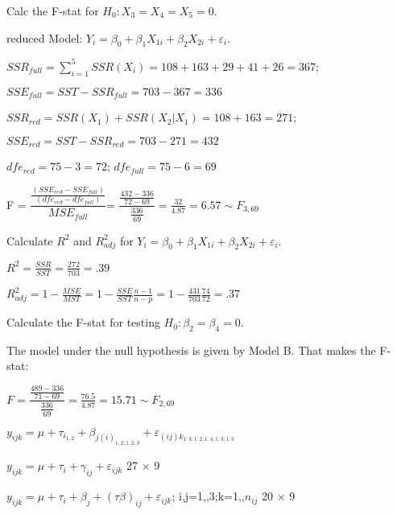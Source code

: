 \documentclass[
  10pt,
  twocolumn]{article}
\begin{document}
Calc the F-stat for \(H_0: X_3 = X_4 = X_5 = 0\).

reduced Model:
\(Y_i = \beta_0 + \beta_1X_{1i}+ \beta_2X_{2i} + \varepsilon_i\).

\(SSR_{full} = \sum_{i=1}^{5}SSR(X_i) = 108 + 163 + 29 + 41 + 26 = 367\);

\(SSE_{full} = SST - SSR_{full} = 703 - 367 = 336\)

\(SSR_{red} = SSR(X_1) + SSR(X_2|X_1) = 108+163 = 271\);

\(SSE_{red} = SST - SSR_{red} = 703 - 271 = 432\)

\(dfe_{red} = 75 - 3 = 72\); \(dfe_{full} = 75 - 6 = 69\)

F =
\(\dfrac{ \frac{(SSE_{red} - SSE_{full})}{(dfe_{red} - dfe_{full})}}{MSE_{full}}\)=
\(\dfrac{\frac{432-336}{72-69} }{\frac{336}{69}} = \frac{32}{4.87} = 6.57 \sim F_{3, 69}\)

Calculate \(R^2\) and \(R^2_{adj}\) for
\(Y_i = \beta_0 + \beta_1X_{1i}+ \beta_2X_{2i} + \varepsilon_i\).

\(R^2 = \frac{SSR}{SST} = \frac{272}{703} = .39\)

\(R^2_{adj} = 1 - \frac{MSE}{MST} = 1- \frac{SSE}{SST} \frac{n-1}{n-p} = 1- \frac{431}{703} \frac{74}{72} = .37\)

Calculate the F-stat for testing \(H_0: \beta_2 = \beta_4 = 0\).

The model under the null hypothesis is given by Model B. That makes the
F-stat:

\(F = \dfrac{\frac{489-336}{71-69} }{\frac{336}{69}} = \frac{76.5}{4.87} = 15.71 \sim F_{2,69}\)

\dotfill

\(y_{ijk}=\mu+\tau_{i_{1,2}}+\beta_{j(i)_{1,2;1,2,3}}+\varepsilon_{(ij)k_{1:3;1:2;1:4;1:3;1:3}}\)

\(y_{ijk}=\mu+\tau_i+\gamma_{ij}+\varepsilon_{ijk}\) 27 \(\times\) 9

\(y_{ijk}=\mu+\tau_i+\beta_{j}+(\tau\beta)_{ij}+\varepsilon_{ijk}\);
i,j=1,,3;k=1,,\(n_{ij}\) 20 \(\times\) 9
\end{document}
